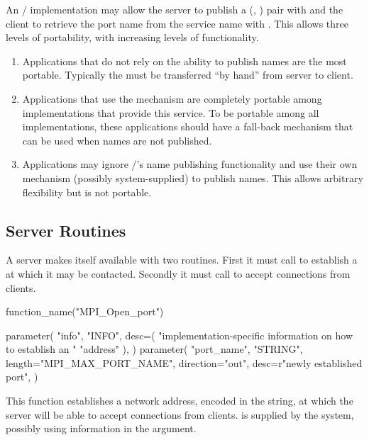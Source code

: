 An \MPI/ implementation may allow the
server to publish a (, )
pair with  and the client
to retrieve the port name from the service name
with . This allows three levels
of portability, with increasing levels of functionality.
\begin{enumerate}
\item Applications that do not rely on the ability to publish
names are the most portable. Typically the 
must be transferred ``by hand'' from server to client.
\item Applications that use the 
mechanism are completely portable among implementations
that provide this service. To be portable among all
implementations, these applications should have a fall-back mechanism
that can be used when names are not published.
\item Applications may ignore \MPI/'s name publishing
functionality and use their own mechanism (possibly
system-supplied) to publish names. This allows arbitrary
flexibility but is not portable.
\end{enumerate}


\subsection{Server Routines}


A server makes itself available with two routines. First
it must call  to establish
a  at which it may be contacted.
Secondly it must call  to accept
connections from clients.

%
\begin{mpi-binding}
    function_name("MPI_Open_port")

    parameter(
        "info",
        "INFO",
        desc=(
            "implementation-specific information on how to establish an "
            "address"
        ),
    )
    parameter(
        "port_name",
        "STRING",
        length="MPI_MAX_PORT_NAME",
        direction="out",
        desc=r"newly established port",
    )
\end{mpi-binding}

This function establishes a network address, encoded in
the  string, at which
the server will be able to accept connections from clients.
 is supplied by the system, possibly
using information in the  argument.

